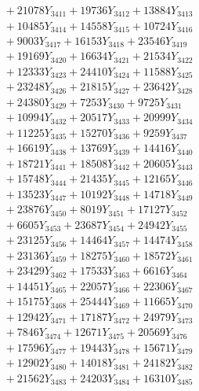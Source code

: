\documentclass[a4paper,10pt]{article}
\begin{document}
{\begin{align}
&\;  + 21078 Y_{3411} + 19736 Y_{3412} + 13884 Y_{3413} \\[0.3ex]
&\;  + 10485 Y_{3414} + 14558 Y_{3415} + 10724 Y_{3416} \\[0.3ex]
&\;  + 9003 Y_{3417} + 16153 Y_{3418} + 23546 Y_{3419} \\[0.5ex]\allowbreak
&\;  + 19169 Y_{3420} + 16634 Y_{3421} + 21534 Y_{3422} \\[0.3ex]
&\;  + 12333 Y_{3423} + 24410 Y_{3424} + 11588 Y_{3425} \\[0.3ex]
&\;  + 23248 Y_{3426} + 21815 Y_{3427} + 23642 Y_{3428} \\[0.3ex]
&\;  + 24380 Y_{3429} + 7253 Y_{3430} + 9725 Y_{3431} \\[0.3ex]
&\;  + 10994 Y_{3432} + 20517 Y_{3433} + 20999 Y_{3434} \\[0.3ex]
&\;  + 11225 Y_{3435} + 15270 Y_{3436} + 9259 Y_{3437} \\[0.3ex]
&\;  + 16619 Y_{3438} + 13769 Y_{3439} + 14416 Y_{3440} \\[0.3ex]
&\;  + 18721 Y_{3441} + 18508 Y_{3442} + 20605 Y_{3443} \\[0.3ex]
&\;  + 15748 Y_{3444} + 21435 Y_{3445} + 12165 Y_{3446} \\[0.3ex]
&\;  + 13523 Y_{3447} + 10192 Y_{3448} + 14718 Y_{3449} \\[0.5ex]\allowbreak
&\;  + 23876 Y_{3450} + 8019 Y_{3451} + 17127 Y_{3452} \\[0.3ex]
&\;  + 6605 Y_{3453} + 23687 Y_{3454} + 24942 Y_{3455} \\[0.3ex]
&\;  + 23125 Y_{3456} + 14464 Y_{3457} + 14474 Y_{3458} \\[0.3ex]
&\;  + 23136 Y_{3459} + 18275 Y_{3460} + 18572 Y_{3461} \\[0.3ex]
&\;  + 23429 Y_{3462} + 17533 Y_{3463} + 6616 Y_{3464} \\[0.3ex]
&\;  + 14451 Y_{3465} + 22057 Y_{3466} + 22306 Y_{3467} \\[0.3ex]
&\;  + 15175 Y_{3468} + 25444 Y_{3469} + 11665 Y_{3470} \\[0.3ex]
&\;  + 12942 Y_{3471} + 17187 Y_{3472} + 24979 Y_{3473} \\[0.3ex]
&\;  + 7846 Y_{3474} + 12671 Y_{3475} + 20569 Y_{3476} \\[0.3ex]
&\;  + 17596 Y_{3477} + 19443 Y_{3478} + 15671 Y_{3479} \\[0.5ex]\allowbreak
&\;  + 12902 Y_{3480} + 14018 Y_{3481} + 24182 Y_{3482} \\[0.3ex]
&\;  + 21562 Y_{3483} + 24203 Y_{3484} + 16310 Y_{3485} \\[0.3ex]

\end{align}}
\end{document}
